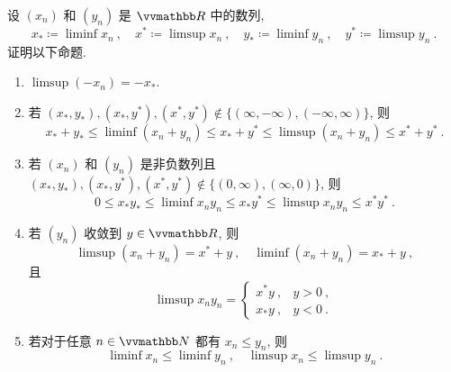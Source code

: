 \begin{exercise}
    设 \((x_n)\) 和 \((y_n)\) 是 \(\R\) 中的数列,
    \[
        x_\ast \coloneqq \liminf x_n\ ,\quad x^\ast \coloneqq \limsup x_n\ ,\quad y_\ast \coloneqq \liminf y_n\ ,\quad y^\ast \coloneqq \limsup y_n\ .
    \]
    证明以下命题.
    \begin{enumerate}
        \item \(\limsup (- x_n) = - x_\ast\).
        \item 若 \((x_\ast, y_\ast), (x_\ast, y^\ast), (x^\ast, y^\ast) \notin \bigl\{(\infty, - \infty), (- \infty, \infty)\bigr\}\), 则
        \[
            x_\ast + y_\ast \leq \liminf (x_n + y_n) \leq x_\ast + y^\ast \leq \limsup (x_n + y_n) \leq x^\ast + y^\ast\ .
        \]
        \item 若 \((x_n)\) 和 \((y_n)\) 是非负数列且 \((x_\ast, y_\ast), (x_\ast, y^\ast), (x^\ast, y^\ast) \notin \bigl\{(0, \infty), (\infty, 0)\bigr\}\), 则
        \[
            0 \leq x_\ast y_\ast \leq \liminf x_n y_n \leq x_\ast y^\ast \leq \limsup x_n y_n \leq x^\ast y^\ast\ .
        \]
        \item 若 \((y_n)\) 收敛到 \(y \in \R\), 则
        \[
            \limsup (x_n + y_n) = x^\ast + y\ ,\quad \liminf (x_n + y_n) = x_\ast + y\ ,
        \]
        且
        \[
            \limsup x_n y_n =
            \begin{cases}
                x^\ast y\ , & y > 0\ , \\
                x_\ast y\ , & y < 0\ .
            \end{cases}
        \]
        \item 若对于任意 \(n \in \N\) 都有 \(x_n \leq y_n\), 则
        \[
            \liminf x_n \leq \liminf y_n\ ,\quad \limsup x_n \leq \limsup y_n\ .
        \]
    \end{enumerate}
\end{exercise}


